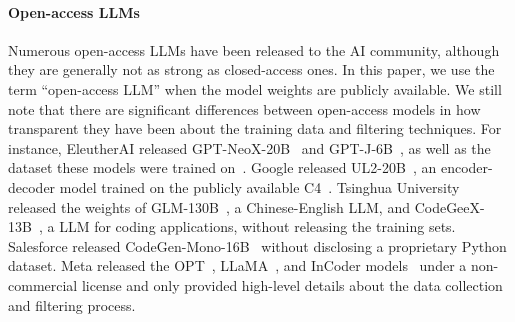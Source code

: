 \documentclass[10pt]{article} %
\begin{document}
\paragraph{Open-access LLMs} Numerous open-access LLMs have been released to the AI community, although they are generally not as strong as closed-access ones. In this paper, we use the term ``open-access LLM'' when the model weights are publicly available. We still note that there are significant differences between open-access models in how transparent they have been about the training data and filtering techniques. For instance, EleutherAI released GPT-NeoX-20B~\citep{black2022gpt} and GPT-J-6B~\citep{wang2021gpt}, as well as the dataset these models were trained on~\citep{gao2020pile}. Google released UL2-20B~\citep{tay2022unifying}, an encoder-decoder model trained on the publicly available C4~\citep{raffel2020exploring}. Tsinghua University released the weights of GLM-130B~\citep{zeng2022glm}, a Chinese-English LLM, and CodeGeeX-13B~\citep{qinkai:codegeex}, a LLM for coding applications, without releasing the training sets.  Salesforce released CodeGen-Mono-16B~\citep{nijkamp:codegen} without disclosing a proprietary Python dataset. Meta released the OPT~\citep{zhang2022opt}, LLaMA~\citep{touvron2023llama}, and InCoder models~\citep{fried2022incoder} under a non-commercial license and only provided high-level details about the data collection and filtering process.  

\end{document}
